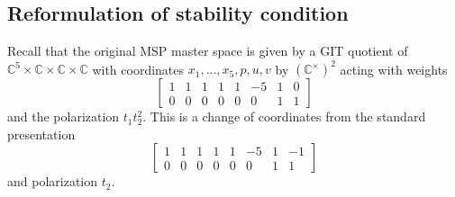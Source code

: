 \documentclass[10pt,oldfontcommands,oneside]{memoir}
\theoremstyle{definition}
\theoremstyle{remark}
\theoremstyle{plain}
\theoremstyle{definition}
\theoremstyle{remark}
\newcommand{\C}{\mathbb{C}}
\newcommand{\1}{\mathbf{1}}
\newcommand{\2}{\mathbf{2}}
\newcommand{\3}{\mathbf{3}}
\begin{document}
\subsection{Reformulation of stability condition}%
\label{sub:Reformulation of stability condition}

Recall that the original MSP master space is given by a GIT quotient of $\C^5 \times \C \times \C \times \C$ with coordinates $x_1, \ldots, x_5, p, u,v$ by $(\C^{\times})^2$ acting with weights
\[ \begin{bmatrix}
    1 & 1 & 1 & 1 & 1 & -5 & 1 & 0 \\
    0 & 0 & 0 & 0 & 0 & 0 & 1 & 1
\end{bmatrix} \]
and the polarization $t_1 t_2^2$. This is a change of coordinates from the standard presentation
\[ \begin{bmatrix}
    1 & 1 & 1 & 1 & 1 & -5 & 1 & -1 \\
    0 & 0 & 0 & 0 & 0 & 0 & 1 & 1
\end{bmatrix} \]
and polarization $t_2$.
\end{document}

